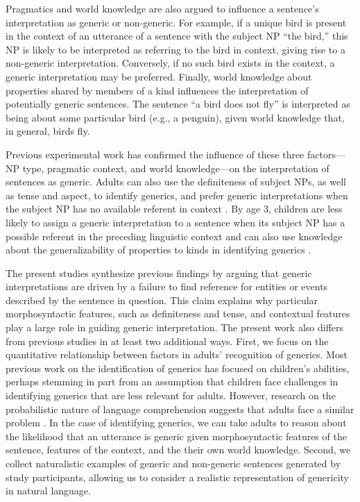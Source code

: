 \documentclass[10pt,letterpaper]{article}
\begin{document}
Pragmatics and world knowledge are also argued to influence a sentence's interpretation as generic or non-generic. For example, if a unique bird is present in the context of an utterance of a sentence with the subject NP ``the bird,'' this NP is likely to be interpreted as referring to the bird in context, giving rise to a non-generic interpretation. Conversely, if no such bird exists in the context, a generic interpretation may be preferred. Finally, world knowledge about properties shared by members of a kind influences the interpretation of potentially generic sentences. The sentence ``a bird does not fly'' is interpreted as being about some particular bird (e.g., a penguin), given world knowledge that, in general, birds fly. 

Previous experimental work has confirmed the influence of these three factors---NP type, pragmatic context, and world knowledge---on the interpretation of sentences as generic. Adults can also use the definiteness of subject NPs, as well as tense and aspect, to identify generics, and prefer generic interpretations when the subject NP has no available referent in context \cite{Gelman:2003,Cimpian:2011}. By age 3, children are less likely to assign a generic interpretation to a sentence when its subject NP has a possible referent in the preceding linguistic context and can also use knowledge about the generalizability of properties to kinds in identifying generics \cite{Cimpian:2008}.

The present studies synthesize previous findings by arguing that generic interpretations are driven by a failure to find reference for entities or events described by the sentence in question. This claim explains why particular morphosyntactic features, such as definiteness and tense, and contextual features play a large role in guiding generic interpretation. The present work also differs from previous studies in at least two additional ways. First, we focus on the quantitative relationship between factors in adults' recognition of generics. Most previous work on the identification of generics has focused on children's abilities, perhaps stemming in part from an assumption that children face challenges in identifying generics that are less relevant for adults. However, research on the probabilistic nature of language comprehension suggests that adults face a similar problem \cite{Levy:2008,Frank:2012}. In the case of identifying generics, we can take adults to reason about the likelihood that an utterance is generic given morphosyntactic features of the sentence, features of the context, and the their own world knowledge. Second, we collect naturalistic examples of generic and non-generic sentences generated by study participants, allowing us to consider a realistic representation of genericity in natural language. 
\end{document}
